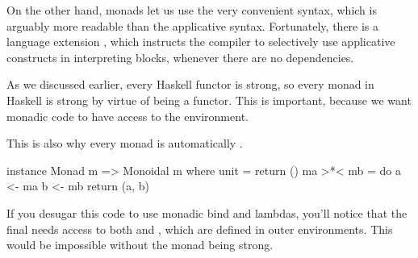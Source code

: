 \documentclass[DaoFP]{subfiles}
\begin{document}
On the other hand, monads let us use the very convenient  syntax, which is arguably more readable than the applicative syntax. Fortunately, there is a language extension , which instructs the compiler to selectively use applicative constructs in interpreting  blocks, whenever there are no dependencies.

As we discussed earlier, every Haskell functor is strong, so every monad in Haskell is strong by virtue of being a functor. This is important, because we want monadic code to have access to the environment. 

This is also why every monad is automatically . 
\begin{haskell}
instance Monad m => Monoidal m where
  unit = return ()
  ma >*< mb = do
    a <- ma
    b <- mb
    return (a, b)
\end{haskell}
If you desugar this code to use monadic bind and lambdas, you'll notice that the final  needs access to both  and , which are defined in outer environments. This would be impossible without the monad being strong.
\end{document}
